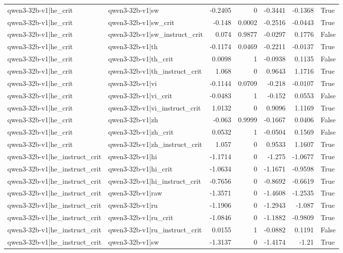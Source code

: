 \begin{table}
\begin{tabular}{l l r r r r l}
qwen3-32b-v1|he_crit & qwen3-32b-v1|sw & -0.2405 & 0 & -0.3441 & -0.1368 & True \\
qwen3-32b-v1|he_crit & qwen3-32b-v1|sw_crit & -0.148 & 0.0002 & -0.2516 & -0.0443 & True \\
qwen3-32b-v1|he_crit & qwen3-32b-v1|sw_instruct_crit & 0.074 & 0.9877 & -0.0297 & 0.1776 & False \\
qwen3-32b-v1|he_crit & qwen3-32b-v1|th & -0.1174 & 0.0469 & -0.2211 & -0.0137 & True \\
qwen3-32b-v1|he_crit & qwen3-32b-v1|th_crit & 0.0098 & 1 & -0.0938 & 0.1135 & False \\
qwen3-32b-v1|he_crit & qwen3-32b-v1|th_instruct_crit & 1.068 & 0 & 0.9643 & 1.1716 & True \\
qwen3-32b-v1|he_crit & qwen3-32b-v1|vi & -0.1144 & 0.0709 & -0.218 & -0.0107 & True \\
qwen3-32b-v1|he_crit & qwen3-32b-v1|vi_crit & -0.0483 & 1 & -0.152 & 0.0553 & False \\
qwen3-32b-v1|he_crit & qwen3-32b-v1|vi_instruct_crit & 1.0132 & 0 & 0.9096 & 1.1169 & True \\
qwen3-32b-v1|he_crit & qwen3-32b-v1|zh & -0.063 & 0.9999 & -0.1667 & 0.0406 & False \\
qwen3-32b-v1|he_crit & qwen3-32b-v1|zh_crit & 0.0532 & 1 & -0.0504 & 0.1569 & False \\
qwen3-32b-v1|he_crit & qwen3-32b-v1|zh_instruct_crit & 1.057 & 0 & 0.9533 & 1.1607 & True \\
qwen3-32b-v1|he_instruct_crit & qwen3-32b-v1|hi & -1.1714 & 0 & -1.275 & -1.0677 & True \\
qwen3-32b-v1|he_instruct_crit & qwen3-32b-v1|hi_crit & -1.0634 & 0 & -1.1671 & -0.9598 & True \\
qwen3-32b-v1|he_instruct_crit & qwen3-32b-v1|hi_instruct_crit & -0.7656 & 0 & -0.8692 & -0.6619 & True \\
qwen3-32b-v1|he_instruct_crit & qwen3-32b-v1|raw & -1.3571 & 0 & -1.4608 & -1.2535 & True \\
qwen3-32b-v1|he_instruct_crit & qwen3-32b-v1|ru & -1.1906 & 0 & -1.2943 & -1.087 & True \\
qwen3-32b-v1|he_instruct_crit & qwen3-32b-v1|ru_crit & -1.0846 & 0 & -1.1882 & -0.9809 & True \\
qwen3-32b-v1|he_instruct_crit & qwen3-32b-v1|ru_instruct_crit & 0.0155 & 1 & -0.0882 & 0.1191 & False \\
qwen3-32b-v1|he_instruct_crit & qwen3-32b-v1|sw & -1.3137 & 0 & -1.4174 & -1.21 & True \\

\end{tabular}
\end{table}
